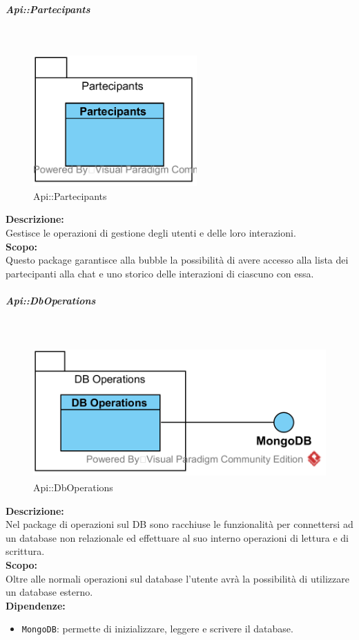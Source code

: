 \begin{samepage}
\subparagraph{Api\-::Partecipants}\label{api-partecipanti}\mbox{}\\
\nopagebreak
\begin{figure}[H]
	\centering
	\includegraphics[height=5cm]{diagrammi_img/classi_e_package/api_partecipanti.png}
	\caption{Api\-::Partecipants}
\end{figure}
\end{samepage}
\textbf{Descrizione:}\\ 
Gestisce le operazioni di gestione degli utenti e delle loro interazioni.\\
\textbf{Scopo:}\\
Questo package garantisce alla bubble la possibilità di avere accesso alla lista dei partecipanti alla chat e uno storico delle interazioni di ciascuno con essa.

\begin{samepage}
\subparagraph{Api\-::DbOperations}\label{api-db}\mbox{}\\
\nopagebreak
\begin{figure}[H]
	\centering
	\includegraphics[height=5cm]{diagrammi_img/classi_e_package/api_operazionidb.png}
	\caption{Api\-::DbOperations}
\end{figure}
\end{samepage}
\textbf{Descrizione:}\\
Nel package di operazioni sul DB sono racchiuse le funzionalità per connettersi ad un database non relazionale ed effettuare al suo interno operazioni di lettura e di scrittura.\\
\textbf{Scopo:}\\
Oltre alle normali operazioni sul database l'utente avrà la possibilità di utilizzare un database esterno.\\
\textbf{Dipendenze:}
\begin{itemize}
	\item \texttt{MongoDB}: permette di inizializzare, leggere e scrivere il database.
\end{itemize}

